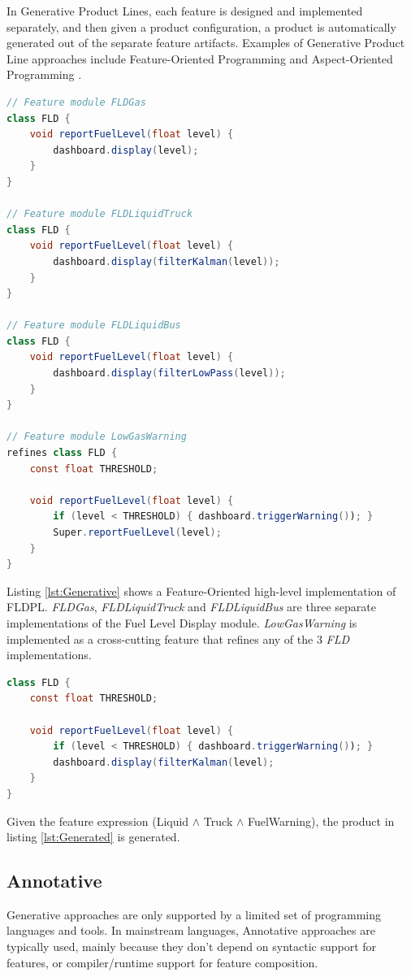 \documentclass[11pt]{article}
\begin{document}
In Generative Product Lines, each feature is designed and implemented separately, and then given a product configuration, a product is automatically generated out of the separate feature artifacts. Examples of Generative Product Line approaches include Feature-Oriented Programming \cite{Prehofer1997} and Aspect-Oriented Programming \cite{Kiczales1997}.

\begin{lstlisting}[language=Java, caption=Generative example, label={lst:Generative}]
// Feature module FLDGas
class FLD {
	void reportFuelLevel(float level) { 
		dashboard.display(level); 
	}
}

// Feature module FLDLiquidTruck
class FLD {
	void reportFuelLevel(float level) { 
		dashboard.display(filterKalman(level)); 
	}
}

// Feature module FLDLiquidBus
class FLD {
	void reportFuelLevel(float level) { 
		dashboard.display(filterLowPass(level)); 
	}
}

// Feature module LowGasWarning
refines class FLD {
	const float THRESHOLD;

	void reportFuelLevel(float level) { 
		if (level < THRESHOLD) { dashboard.triggerWarning()); }
		Super.reportFuelLevel(level);
	}
} 
\end{lstlisting}

Listing \ref{lst:Generative} shows a Feature-Oriented high-level implementation of FLDPL. \emph{FLDGas}, \emph{FLDLiquidTruck} and \emph{FLDLiquidBus} are three separate implementations of the Fuel Level Display module. \emph{LowGasWarning} is implemented as a cross-cutting feature that refines any of the 3 \emph{FLD} implementations. 

\begin{lstlisting}[language=Java, caption=Generated Product, label={lst:Generated}]
class FLD {
	const float THRESHOLD;

	void reportFuelLevel(float level) { 
		if (level < THRESHOLD) { dashboard.triggerWarning()); }
		dashboard.display(filterKalman(level);
	}
} 
\end{lstlisting}

Given the feature expression (Liquid $\wedge$ Truck $\wedge$ FuelWarning), the product in listing \ref{lst:Generated} is generated.

\subsection{Annotative}

Generative approaches are only supported by a limited set of programming languages and tools. In mainstream languages, Annotative approaches are typically used, mainly because they don't depend on syntactic support for features, or compiler/runtime support for feature composition.
\end{document}
